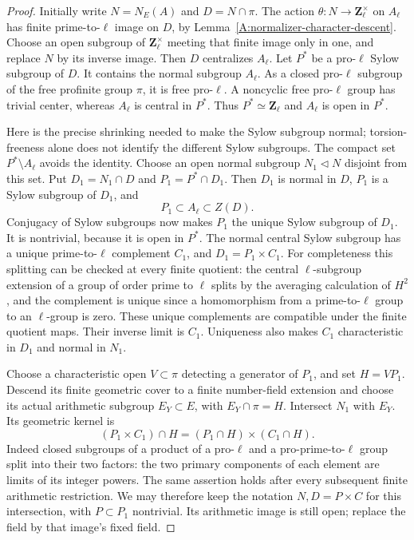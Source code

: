 \documentclass[11pt,oneside]{article}
\begin{document}
\begin{proof}
Initially write $N=N_E(A)$ and $D=N\cap\pi$.
The action $\theta:N\to\mathbf Z_\ell^\times$
on $A_\ell$ has finite prime-to-$\ell$ image
on $D$, by Lemma~\ref{A:normalizer-character-descent}.
Choose an open subgroup of
$\mathbf Z_\ell^\times$ meeting that finite image
only in one, and replace $N$ by its inverse
image. Then $D$ centralizes $A_\ell$.
Let $P^*$ be a pro-$\ell$ Sylow subgroup of $D$.
It contains the normal subgroup $A_\ell$.
As a closed pro-$\ell$ subgroup of the free
profinite group $\pi$, it is free pro-$\ell$.
A noncyclic free pro-$\ell$ group has trivial
center, whereas $A_\ell$ is central in $P^*$.
Thus $P^*\simeq\mathbf Z_\ell$ and $A_\ell$
is open in $P^*$.

Here is the precise shrinking needed to make the
Sylow subgroup normal; torsion-freeness alone
does not identify the different Sylow subgroups.
The compact set $P^*\setminus A_\ell$ avoids
the identity. Choose an open normal subgroup
$N_1\triangleleft N$ disjoint from this set.
Put $D_1=N_1\cap D$ and $P_1=P^*\cap D_1$.
Then $D_1$ is normal in $D$, $P_1$ is a Sylow
subgroup of $D_1$, and
\[
                 P_1\subset A_\ell\subset Z(D).
\]
Conjugacy of Sylow subgroups now makes $P_1$
the unique Sylow subgroup of $D_1$.
It is nontrivial, because it is open in $P^*$.
The normal central Sylow subgroup has a unique
prime-to-$\ell$ complement $C_1$, and
$D_1=P_1\times C_1$.
For completeness this splitting can be checked
at every finite quotient: the central
$\ell$-subgroup extension of a group of order
prime to $\ell$ splits by the averaging
calculation of $H^2$, and the complement is
unique since a homomorphism from a prime-to-$\ell$
group to an $\ell$-group is zero. These unique
complements are compatible under the finite
quotient maps. Their inverse limit is $C_1$.
Uniqueness also makes $C_1$ characteristic in
$D_1$ and normal in $N_1$.

Choose a characteristic open $V\subset\pi$
detecting a generator of $P_1$, and set
$H=V P_1$. Descend its finite geometric cover
to a finite number-field extension and choose
its actual arithmetic subgroup $E_Y\subset E$,
with $E_Y\cap\pi=H$. Intersect $N_1$ with
$E_Y$. Its geometric kernel is
\[
 (P_1\times C_1)\cap H
       =(P_1\cap H)\times(C_1\cap H).
                                                        \tag{A45}
\]
Indeed closed subgroups of a product of a
pro-$\ell$ and a pro-prime-to-$\ell$ group
split into their two factors: the two primary
components of each element are limits of its
integer powers. The same assertion holds
after every subsequent finite arithmetic
restriction. We may therefore keep the notation
$N,D=P\times C$ for this intersection, with
$P\subset P_1$ nontrivial. Its arithmetic
image is still open; replace the field by
that image's fixed field.


\end{proof}
\end{document}
